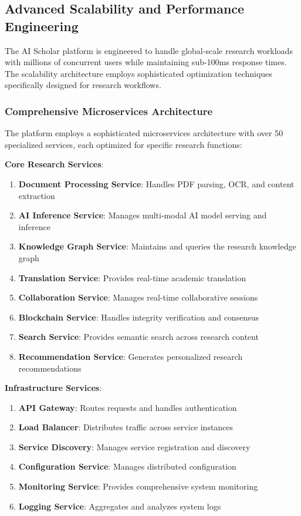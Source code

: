 \documentclass[10pt,twocolumn]{article}
\begin{document}
\subsection{Advanced Scalability and Performance Engineering}

The AI Scholar platform is engineered to handle global-scale research workloads with millions of concurrent users while maintaining sub-100ms response times. The scalability architecture employs sophisticated optimization techniques specifically designed for research workflows.

\subsubsection{Comprehensive Microservices Architecture}

The platform employs a sophisticated microservices architecture with over 50 specialized services, each optimized for specific research functions:

\textbf{Core Research Services}:
\begin{enumerate}
    \item \textbf{Document Processing Service}: Handles PDF parsing, OCR, and content extraction
    \item \textbf{AI Inference Service}: Manages multi-modal AI model serving and inference
    \item \textbf{Knowledge Graph Service}: Maintains and queries the research knowledge graph
    \item \textbf{Translation Service}: Provides real-time academic translation
    \item \textbf{Collaboration Service}: Manages real-time collaborative sessions
    \item \textbf{Blockchain Service}: Handles integrity verification and consensus
    \item \textbf{Search Service}: Provides semantic search across research content
    \item \textbf{Recommendation Service}: Generates personalized research recommendations
\end{enumerate}

\textbf{Infrastructure Services}:
\begin{enumerate}
    \item \textbf{API Gateway}: Routes requests and handles authentication
    \item \textbf{Load Balancer}: Distributes traffic across service instances
    \item \textbf{Service Discovery}: Manages service registration and discovery
    \item \textbf{Configuration Service}: Manages distributed configuration
    \item \textbf{Monitoring Service}: Provides comprehensive system monitoring
    \item \textbf{Logging Service}: Aggregates and analyzes system logs
\end{enumerate}
\end{document}
